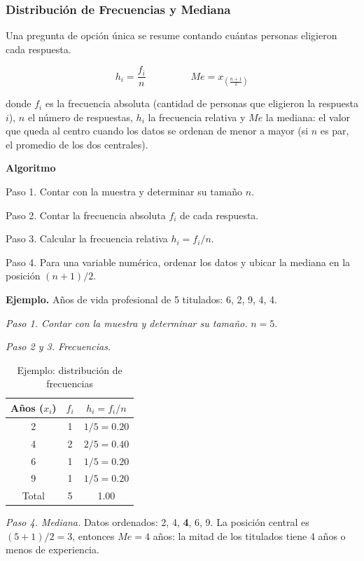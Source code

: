 \documentclass[12pt, a4paper]{article}
\newenvironment{mitabla}[2][H]{%
  \begin{table}[#1]
  \centering
  \caption{#2}
  \small
}{%
  \end{table}
}
\begin{document}
\subsubsection{Distribución de Frecuencias y Mediana}\label{sec:frecuencias}

Una pregunta de opción única se resume contando cuántas personas eligieron
cada respuesta.

\[
\boxed{\;h_i = \frac{f_i}{n}\;}
\qquad\qquad
\boxed{\;Me = x_{\left(\frac{n+1}{2}\right)}\;}
\]

donde $f_i$ es la frecuencia absoluta (cantidad de personas que eligieron
la respuesta $i$), $n$ el número de respuestas, $h_i$ la frecuencia
relativa y $Me$ la mediana: el valor que queda al centro cuando los datos
se ordenan de menor a mayor (si $n$ es par, el promedio de los dos
centrales).

\textbf{Algoritmo}

Paso 1. Contar con la muestra y determinar su tamaño $n$.

Paso 2. Contar la frecuencia absoluta $f_i$ de cada respuesta.

Paso 3. Calcular la frecuencia relativa $h_i = f_i/n$.

Paso 4. Para una variable numérica, ordenar los datos y ubicar la mediana
en la posición $(n+1)/2$.

\textbf{Ejemplo.} Años de vida profesional de 5 titulados: 6, 2, 9, 4, 4.

\textit{Paso 1. Contar con la muestra y determinar su tamaño.} $n = 5$.

\textit{Paso 2 y 3. Frecuencias.}

\begin{mitabla}{Ejemplo: distribución de frecuencias}
\begin{tabular}{ccc}
\toprule
Años ($x_i$) & $f_i$ & $h_i = f_i/n$ \\
\midrule
2 & 1 & $1/5 = 0.20$ \\
4 & 2 & $2/5 = 0.40$ \\
6 & 1 & $1/5 = 0.20$ \\
9 & 1 & $1/5 = 0.20$ \\
\midrule
Total & 5 & 1.00 \\
\bottomrule
\end{tabular}
\end{mitabla}

\textit{Paso 4. Mediana.} Datos ordenados: 2, 4, \textbf{4}, 6, 9. La
posición central es $(5+1)/2 = 3$, entonces $Me = 4$ años: la mitad de
los titulados tiene 4 años o menos de experiencia.
\end{document}
